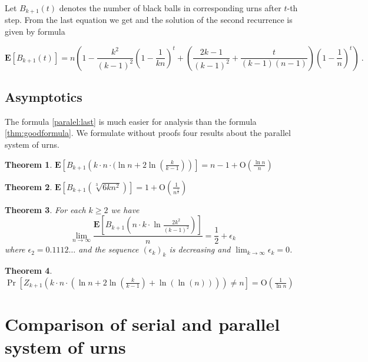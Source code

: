 \documentclass[submission]{dmtcs}
\newtheorem{theorem}{Theorem}
\newcommand{\E}[1]{\mathbf{E}\left[#1\right]}
\newcommand{\BigO}[1]{\mathrm{O}\left(#1\right)}
\begin{document}
Let $B_{k+1}(t)$ denotes the number of black balls in corresponding 
urns after $t$-th step. From the last equation we get
and the solution of the second recurrence is given by formula

\begin{equation}
\label{paralel:last}
\E{B_{k+1}(t)} = 
n 
\left(
1 - 
\frac{k^2}{(k-1)^2} \left(1-\frac{1}{k n}\right)^t+
\left(\frac{2 k-1}{(k-1)^2} + 
\frac{t}{(k-1)(n-1)}
\right) \left(1-\frac{1}{n}\right)^t 
\right)~.
\end{equation}


\subsection{Asymptotics}



The formula \ref{paralel:last} is much easier for analysis than the formula
\ref{thm:goodformula}. We formulate without proofs four results about
the parallel system of urns.
 
\begin{theorem}\label{thm8xc}
$
  \E{B_{k+1}\left(k\cdot n\cdot (\ln n + 2 \ln(\frac{k}{k-1})\right)} = 
	  n-1 + \BigO{\frac{\ln n}{n}}
$
\end{theorem}

\begin{theorem}\label{thm9xc}
$
  \E{B_{k+1}\left(\sqrt[3]{6 k n^2}\right)} = 1 + \BigO{\frac{1}{n^\frac13}}
$
\end{theorem}

\begin{theorem}\label{thm10xc} For each $k\geq 2$ we have
$$
  \lim_{n\to\infty}\frac{\E{B_{k+1}\left( n\cdot k\cdot \ln\frac{2 k^2}{(k-1)^2}\right)}}{n} = 
	  \frac12 + \epsilon_k
$$
where $\epsilon_2=0.1112\ldots$ and the sequence $(\epsilon_k)_k$ is decreasing 
and $\lim_{k\to\infty}\epsilon_k = 0$.
\end{theorem}
\begin{theorem}
$
\Pr[Z_{k+1}(k \cdot n \cdot(\ln n + 2 \ln(\frac{k}{k-1})+\ln(\ln(n))))\neq n] = \BigO{\frac{1}{\ln n}}
$
\end{theorem}

\section{Comparison of serial and parallel system of urns}\label{Comparison}
\end{document}
